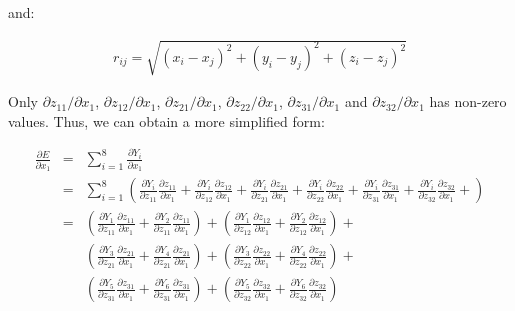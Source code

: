 \documentclass{article}
\begin{document}
\noindent and:

\begin{eqnarray}
r_{ij} = \sqrt{(x_i - x_j)^2 + (y_i - y_j)^2 + (z_i - z_j)^2}
\end{eqnarray}

\noindent Only $\partial{z_{11}} / \partial{x_1}$, 
$\partial{z_{12}} / \partial{x_1}$, $\partial{z_{21}} / \partial{x_1}$,
$\partial{z_{22}} / \partial{x_1}$, $\partial{z_{31}} / \partial{x_1}$ and
$\partial{z_{32}} / \partial{x_1}$ has non-zero values. Thus, we can obtain a more 
simplified form:

\begin{eqnarray}
\frac{\partial{E}}{\partial{x_1}} & = & \sum_{i=1}^{8}{
	\frac{\partial{Y_{i}}}{\partial{x_1}}
} \nonumber \\
& = & 
\sum_{i=1}^{8}{\left(
	\frac{\partial{Y_{i}}}{\partial{z_{11}}}\frac{\partial{z_{11}}}{\partial{x_1}} +
	\frac{\partial{Y_{i}}}{\partial{z_{12}}}\frac{\partial{z_{12}}}{\partial{x_1}} +
	\frac{\partial{Y_{i}}}{\partial{z_{21}}}\frac{\partial{z_{21}}}{\partial{x_1}} +
	\frac{\partial{Y_{i}}}{\partial{z_{22}}}\frac{\partial{z_{22}}}{\partial{x_1}} +
	\frac{\partial{Y_{i}}}{\partial{z_{31}}}\frac{\partial{z_{31}}}{\partial{x_1}} +
	\frac{\partial{Y_{i}}}{\partial{z_{32}}}\frac{\partial{z_{32}}}{\partial{x_1}} +
\right)
} \nonumber \\
& = &
\left(
	\frac{\partial{Y_{1}}}{\partial{z_{11}}}\frac{\partial{z_{11}}}{\partial{x_1}} +
	\frac{\partial{Y_{2}}}{\partial{z_{11}}}\frac{\partial{z_{11}}}{\partial{x_1}} 
\right) +
\left(
	\frac{\partial{Y_{1}}}{\partial{z_{12}}}\frac{\partial{z_{12}}}{\partial{x_1}} +
	\frac{\partial{Y_{2}}}{\partial{z_{12}}}\frac{\partial{z_{12}}}{\partial{x_1}} 
\right) + \nonumber \\
&&
\left(
	\frac{\partial{Y_{3}}}{\partial{z_{21}}}\frac{\partial{z_{21}}}{\partial{x_1}} +
	\frac{\partial{Y_{4}}}{\partial{z_{21}}}\frac{\partial{z_{21}}}{\partial{x_1}} 
\right) +
\left(
	\frac{\partial{Y_{3}}}{\partial{z_{22}}}\frac{\partial{z_{22}}}{\partial{x_1}} +
	\frac{\partial{Y_{4}}}{\partial{z_{22}}}\frac{\partial{z_{22}}}{\partial{x_1}} 
\right) + \nonumber \\
&&
\left(
	\frac{\partial{Y_{5}}}{\partial{z_{31}}}\frac{\partial{z_{31}}}{\partial{x_1}} +
	\frac{\partial{Y_{6}}}{\partial{z_{31}}}\frac{\partial{z_{31}}}{\partial{x_1}} 
\right) +
\left(
	\frac{\partial{Y_{5}}}{\partial{z_{32}}}\frac{\partial{z_{32}}}{\partial{x_1}} +
	\frac{\partial{Y_{6}}}{\partial{z_{32}}}\frac{\partial{z_{32}}}{\partial{x_1}}
\right) \nonumber \\

\end{eqnarray}
\end{document}
